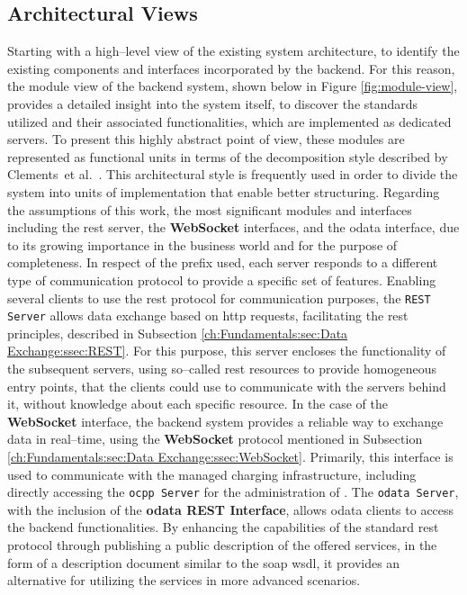 \subsection{Architectural Views}
\label{ch:Implementation:sec:Reservation System:ssec:System Architecture}

Starting with a high--level view of the existing system architecture, to identify the existing components and interfaces incorporated by the backend. 
For this reason, the module view of the backend system, shown below in Figure \ref{fig:module-view}, provides a detailed insight into the system itself, to discover the standards utilized and their associated functionalities, which are implemented as dedicated servers.
To present this highly abstract point of view, these modules are represented as functional units in terms of the decomposition style described by Clements~et al.~\cite[p.~67]{clements_documenting_2011}.
This architectural style is frequently used in order to divide the system into units of implementation that enable better structuring.
Regarding the assumptions of this work, the most significant modules and interfaces including the \acrshort{rest} server, the \textbf{WebSocket} interfaces, and the \acrshort{odata} interface, due to its growing importance in the business world and for the purpose of completeness.
In respect of the prefix used, each server responds to a different type of communication protocol to provide a specific set of features.
Enabling several clients to use the \acrshort{rest} protocol for communication purposes, the \texttt{REST Server} allows data exchange based on \acrshort{http} requests, facilitating the \acrshort{rest} principles, described in Subsection \ref{ch:Fundamentals:sec:Data Exchange:ssec:REST}. 
For this purpose, this server encloses the functionality of the subsequent servers, using so--called \acrshort{rest} resources to provide homogeneous entry points, that the clients could use to communicate with the servers behind it, without knowledge about each specific resource. 
In the case of the \textbf{WebSocket} interface, the backend system provides a reliable way to exchange data in real--time, using the \textbf{WebSocket} protocol mentioned in Subsection \ref{ch:Fundamentals:sec:Data Exchange:ssec:WebSocket}. 
Primarily, this interface is used to communicate with the managed charging infrastructure, including directly accessing the \texttt{\acrshort{ocpp} Server} for the administration of .
The \texttt{\acrshort{odata} Server}, with the inclusion of the \textbf{\acrshort{odata} REST Interface}, allows \acrshort{odata} clients to access the backend functionalities. 
By enhancing the capabilities of the standard \acrshort{rest} protocol through publishing a public description of the offered services, in the form of a description document similar to the \acrshort{soap} \acrshort{wsdl}, it provides an alternative for utilizing the services in more advanced scenarios.

